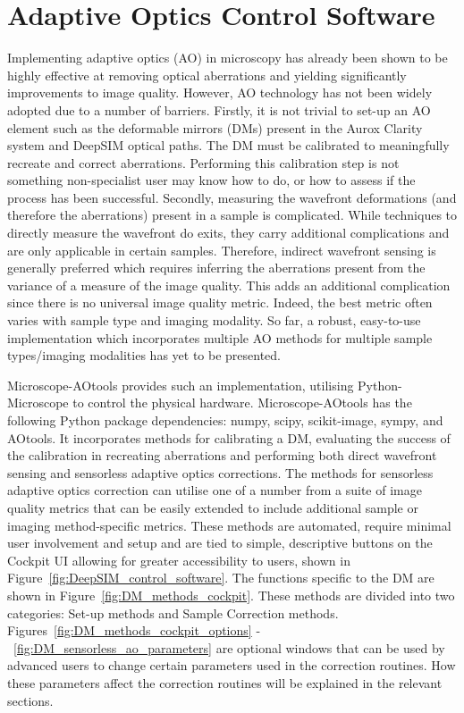 \chapter{Adaptive Optics Control Software}
\label{chpt:ao_tools}

Implementing adaptive optics (AO) in microscopy has already been shown to be highly effective at removing optical aberrations and yielding significantly improvements to image quality\cite{booth2014adaptive,girkin2009adaptive}. However, AO technology has not been widely adopted due to a number of barriers. Firstly, it is not trivial to set-up an AO element such as the deformable mirrors (DMs) present in the Aurox Clarity system and DeepSIM optical paths. The DM must be calibrated to meaningfully recreate and correct aberrations. Performing this calibration step is not something non-specialist user may know how to do, or how to assess if the process has been successful. Secondly, measuring the wavefront deformations (and therefore the aberrations) present in a sample is complicated. While techniques to directly measure the  wavefront do exits, they carry additional complications and are only applicable in certain samples\cite{wang2014rapid,wang2015direct}. Therefore, indirect wavefront sensing is generally preferred which requires inferring the aberrations present from the variance of a measure of the image quality\cite{rodriguez2018adaptive}. This adds an additional complication since there is no universal image quality metric. Indeed, the best metric often varies with sample type and imaging modality\cite{burke2015adaptive,booth2002adaptive,fienup2003aberration,debarre2008adaptive}. So far, a robust, easy-to-use implementation which incorporates multiple AO methods for multiple sample types/imaging modalities has yet to be presented\cite{ji2017adaptive}.

Microscope-AOtools provides such an implementation, utilising 
Python-Microscope to control the physical hardware. Microscope-AOtools
has the following Python package dependencies: numpy\cite{walt2011numpy},
scipy\cite{virtanen2020scipy}, scikit-image\cite{van2014scikit}, 
sympy\cite{meurer2017sympy}, and AOtools\cite{townson2019aotools}.
It incorporates methods for calibrating a DM, evaluating the success
of the calibration in recreating aberrations and performing both
direct wavefront sensing and sensorless adaptive optics
corrections. The methods for sensorless adaptive optics correction can
utilise one of a number from a suite of image quality metrics that can be easily extended to include additional sample or imaging method-specific metrics. These methods are automated, require minimal user involvement and setup and are tied to simple, descriptive  buttons on the Cockpit UI allowing for greater accessibility to users, shown in Figure~\ref{fig:DeepSIM_control_software}. The functions specific to the DM are shown in Figure~\ref{fig:DM_methods_cockpit}. These methods are divided into two categories: Set-up methods and Sample Correction methods. Figures~\ref{fig:DM_methods_cockpit_options} -~\ref{fig:DM_sensorless_ao_parameters} are optional windows that can be used by advanced users to change certain parameters used in the correction routines. How these parameters affect the correction routines will be explained in the relevant sections.

